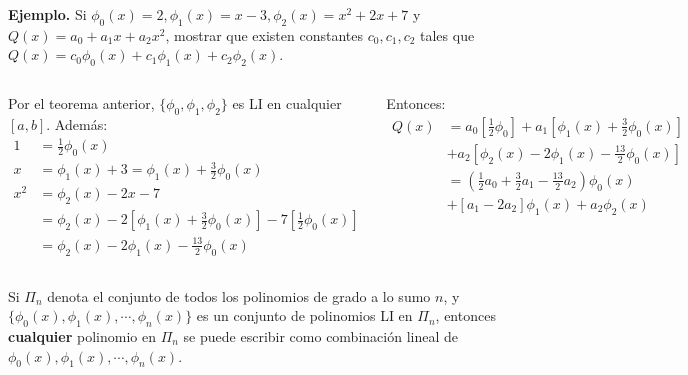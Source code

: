 \documentclass[9pt, aspectratio=169]{beamer}
\begin{document}
\begin{frame}
	\textbf{Ejemplo.} Si $\phi_0(x) = 2, \phi_1(x) = x-3, \phi_2(x) = x^2 + 2x+7$ y $Q(x) = a_0 + a_1 x + a_2 x^2$, mostrar que existen constantes $c_0, c_1, c_2$ tales que $Q(x) = c_0 \phi_0(x) + c_1 \phi_1(x) + c_2 \phi_2(x)$.
	\vspace{1em} \pause

	\begin{columns}[t]
		\cx
		Por el teorema anterior, $\{\phi_0, \phi_1, \phi_2 \}$ es LI en cualquier $[a, b]$. Además:
		\begin{align*}
			1   & = \frac{1}{2}\phi_0(x)                                                                                    \\
			x   & = \phi_1(x) + 3 = \phi_1(x) + \frac{3}{2} \phi_0(x)                                                       \\
			x^2 & = \phi_2(x) - 2 x - 7                                                                                     \\
			    & = \phi_2(x) - 2 \left[ \phi_1(x) + \frac{3}{2} \phi_0(x) \right] - 7 \left[ \frac{1}{2} \phi_0(x) \right] \\
			    & = \phi_2(x) -2 \phi_1(x) - \frac{13}{2} \phi_0(x)
		\end{align*} \pause

		\cx
		Entonces:
		\begin{align*}
			Q(x) & = a_0 \left[ \frac{1}{2} \phi_0 \right] + a_1 \left[ \phi_1(x) + \frac{3}{2} \phi_0(x)  \right] \\
			     & + a_2 \left[ \phi_2(x) - 2\phi_1(x) - \frac{13}{2} \phi_0(x) \right]                            \\
			     & = \left( \frac{1}{2} a_0 + \frac{3}{2} a_1 - \frac{13}{2} a_2 \right) \phi_0(x)                 \\
			     & + [a_1 - 2 a_2] \phi_1(x) + a_2 \phi_2(x)
		\end{align*}
	\end{columns} \pause

	\begin{theorem}[]
		Si $\Pi_n$ denota el conjunto de todos los polinomios de grado a lo sumo $n$, y $\{\phi_0(x), \phi_1(x), \cdots, \phi_n(x) \}$ es un conjunto de polinomios LI en $\Pi_n$, entonces \textbf{cualquier} polinomio en $\Pi_n$ se puede escribir como combinación lineal de $\phi_0(x), \phi_1(x), \cdots, \phi_n(x)$.
	\end{theorem}

\end{frame}
\end{document}

